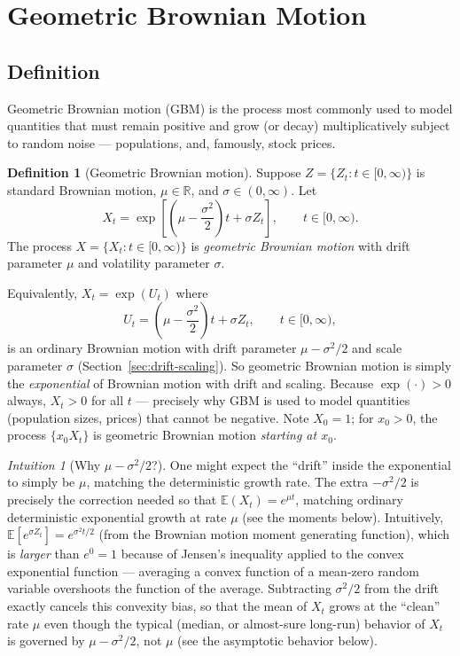 \documentclass[12pt,openany]{book}
\theoremstyle{definition}
\newtheorem{definition}[theorem]{Definition}
\theoremstyle{remark}
\newtheorem{intuition}[theorem]{Intuition}
\newcommand{\R}{\mathbb{R}}
\newcommand{\E}{\mathbb{E}}
\begin{document}
\section{Geometric Brownian Motion}
\label{sec:gbm}
 
\subsection{Definition}
 
Geometric Brownian motion (GBM) is the process most commonly used to model quantities that must remain positive and grow (or decay) multiplicatively subject to random noise — populations, and, famously, stock prices.
 
\begin{definition}[Geometric Brownian motion]
Suppose $Z=\{Z_t : t\in[0,\infty)\}$ is standard Brownian motion, $\mu\in\R$, and $\sigma\in(0,\infty)$. Let
\begin{equation}
    X_t = \exp\!\left[\left(\mu-\frac{\sigma^2}{2}\right)t + \sigma Z_t\right], \qquad t\in[0,\infty). \tag{18.4.1}
\end{equation}
The process $X=\{X_t : t\in[0,\infty)\}$ is \emph{geometric Brownian motion} with drift parameter $\mu$ and volatility parameter $\sigma$.
\end{definition}
 
Equivalently, $X_t = \exp(U_t)$ where
\begin{equation}
    U_t = \left(\mu-\frac{\sigma^2}{2}\right)t + \sigma Z_t, \qquad t\in[0,\infty), \tag{18.4.2}
\end{equation}
is an ordinary Brownian motion with drift parameter $\mu-\sigma^2/2$ and scale parameter $\sigma$ (Section~\ref{sec:drift-scaling}). So geometric Brownian motion is simply the \emph{exponential} of Brownian motion with drift and scaling. Because $\exp(\cdot) > 0$ always, $X_t>0$ for all $t$ — precisely why GBM is used to model quantities (population sizes, prices) that cannot be negative. Note $X_0=1$; for $x_0>0$, the process $\{x_0 X_t\}$ is geometric Brownian motion \emph{starting at $x_0$}.
 
\begin{intuition}[Why $\mu-\sigma^2/2$?]
One might expect the ``drift'' inside the exponential to simply be $\mu$, matching the deterministic growth rate. The extra $-\sigma^2/2$ is precisely the correction needed so that $\E(X_t)=e^{\mu t}$, matching ordinary deterministic exponential growth at rate $\mu$ (see the moments below). Intuitively, $\E[e^{\sigma Z_t}] = e^{\sigma^2 t/2}$ (from the Brownian motion moment generating function), which is \emph{larger} than $e^{0}=1$ because of Jensen's inequality applied to the convex exponential function — averaging a convex function of a mean-zero random variable overshoots the function of the average. Subtracting $\sigma^2/2$ from the drift exactly cancels this convexity bias, so that the mean of $X_t$ grows at the ``clean'' rate $\mu$ even though the typical (median, or almost-sure long-run) behavior of $X_t$ is governed by $\mu-\sigma^2/2$, not $\mu$ (see the asymptotic behavior below).
\end{intuition}
 
\end{document}
